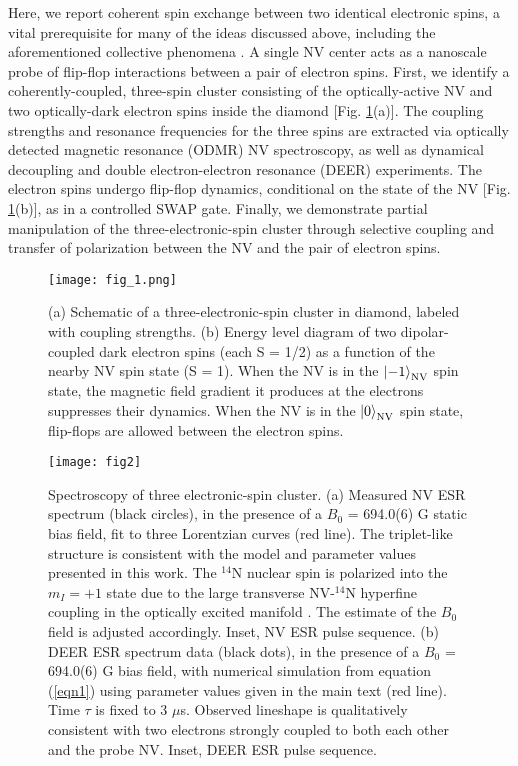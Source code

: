 \documentclass[%
 reprint,
 amsmath,amssymb,
 aps,
]{revtex4-1}
\begin{document}
Here, we report coherent spin exchange between two identical electronic spins, a vital prerequisite for many of the ideas discussed above, including the aforementioned collective phenomena \cite{schweiger, spectral diffusion, silicon,joonhee,lukin mbl}. A single NV center acts as a nanoscale probe of flip-flop interactions between a pair of electron spins. First, we identify a coherently-coupled, three-spin cluster consisting of the optically-active NV and two optically-dark electron spins inside the diamond [Fig. \ref{fig:fig1}(a)]. The coupling strengths and resonance frequencies for the three spins are extracted via optically detected magnetic resonance (ODMR) NV spectroscopy, as well as dynamical decoupling and double electron-electron resonance (DEER) experiments. The electron spins undergo flip-flop dynamics, conditional on the state of the NV [Fig. \ref{fig:fig1}(b)], as in a controlled SWAP gate. Finally, we demonstrate partial manipulation of the three-electronic-spin cluster through selective coupling and transfer of polarization between the NV and the pair of electron spins. 
\begin{figure}[h!]
\centering
\texttt{[image: fig\_1.png]}
\caption{\label{fig:fig1} (a) Schematic of a three-electronic-spin cluster in diamond, labeled with coupling strengths. (b) Energy level diagram of two dipolar-coupled dark electron spins (each S = 1/2) as a function of the nearby NV spin state (S = 1). When the NV is in the $\ket{-1}_{\text{NV}}$ spin state, the magnetic field gradient it produces at the electrons suppresses their dynamics. When the NV is in the $\ket{0}_{\text{NV}}$ spin state, flip-flops are allowed between the electron spins.}
\end{figure}
\begin{figure}[h!]
\centering
\texttt{[image: fig2]}
\caption{\label{fig:fig2} Spectroscopy of three electronic-spin cluster. (a) Measured NV ESR spectrum (black circles), in the presence of a $B_0$ = 694.0(6) G static bias field, fit to three Lorentzian curves (red line). The triplet-like structure is consistent with the model and parameter values presented in this work. The $^{14}$N nuclear spin is polarized into the $m_I=+1$ state due to the large transverse NV-$^{14}$N hyperfine coupling in the optically excited manifold \cite{ran fisher, v jacques}. The estimate of the $B_0$ field is adjusted accordingly. Inset, NV ESR pulse sequence. (b) DEER ESR spectrum data (black dots), in the presence of a $B_0$ = 694.0(6) G bias field, with numerical simulation from equation (\ref{eqn1}) using parameter values given in the main text (red line). Time $\tau$ is fixed to 3 $\mu$s. Observed lineshape is qualitatively consistent with two electrons strongly coupled to both each other and the probe NV. Inset, DEER ESR pulse sequence.}
\end{figure}
\end{document}
